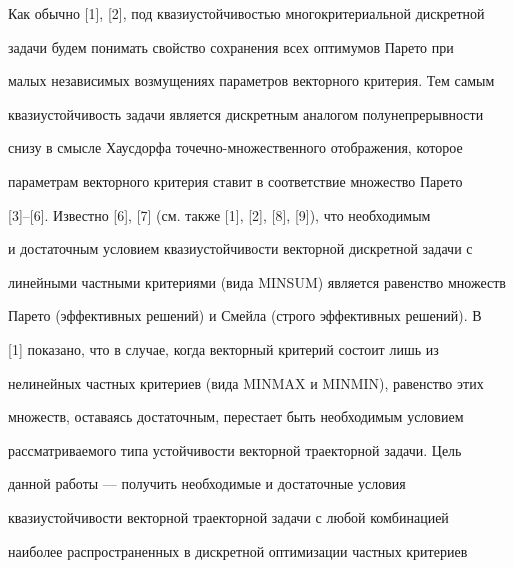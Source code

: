 

\maketitle


\label{begin}




















Как обычно [1], [2], под квазиустойчивостью многокритериальной дискретной


задачи будем понимать свойство сохранения всех оптимумов Парето при


малых независимых возмущениях параметров векторного критерия. Тем самым


квазиустойчивость задачи является дискретным аналогом полунепрерывности


снизу в смысле Хаусдорфа точечно-множественного отображения, которое


параметрам векторного критерия ставит в соответствие множество Парето


[3]--[6]. Известно [6], [7] (см. также [1], [2], [8], [9]), что необходимым


и достаточным условием квазиустойчивости векторной дискретной задачи с


линейными частными критериями (вида MINSUM) является равенство множеств


Парето (эффективных решений) и Смейла (строго эффективных решений). В


[1] показано, что в случае, когда векторный критерий состоит лишь из


нелинейных частных критериев (вида MINMAX и MINMIN), равенство этих


множеств, оставаясь достаточным, перестает быть необходимым условием


рассматриваемого типа устойчивости векторной траекторной задачи. Цель


данной работы --- получить необходимые и достаточные условия


квазиустойчивости векторной траекторной задачи с любой комбинацией


наиболее распространенных в дискретной оптимизации частных критериев


